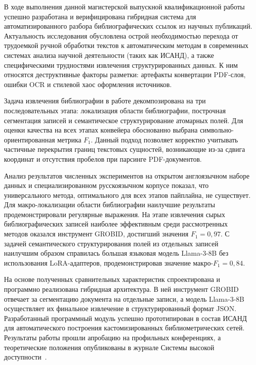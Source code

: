 В ходе выполнения данной магистерской выпускной квалификационной работы успешно разработана и верифицирована гибридная система для авто\-ма\-ти\-зи\-ро\-ван\-но\-го разбора библиографических ссылок из научных публикаций. Актуальность иссле\-до\-ва\-ния обусловлена острой необходимостью перехода от трудоемкой ручной обработки текстов к автоматическим методам в современных сис\-те\-мах анализа научной дея\-тель\-нос\-ти (таких как ИСАНД), а также специфическими трудностями извлечения структурированных данных. К ним относятся деструктивные факторы разметки: ар\-те\-фак\-ты конвертации PDF-слоя, ошибки OCR и \guillemotleft стилевой хаос\guillemotright{} оформления источников.

Задача извлечения библиографии в работе декомпозирована на три последовательных этапа: локализация области библиографии, построчная сегментация записей и се\-ман\-ти\-чес\-кое структурирование атомарных полей. Для оценки качества на всех этапах конвейера обоснованно выбрана символьно-ориентированная метрика $F_1$. Данный подход позволяет корректно учитывать частичные перекрытия границ текстовых сущностей, возникающие из-за сдвига координат и отсутствия пробелов при парсинге PDF-документов.

Анализ результатов численных экспериментов на открытом англоязычном наборе данных и специализированном русскоязычном корпусе показал, что универсального метода, оптимального для всех этапов пайплайна, не существует. Для макро-ло\-ка\-ли\-за\-ции области библиографии наилучшие результаты продемонстрировали регулярные выражения. На этапе извлечения сырых библиографических записей наиболее эф\-фек\-тив\-ным среди рассмотренных методов оказался инструмент GROBID, достигший значения $F_1 = 0{,}97$. С задачей семантического структурирования полей из отдельных записей наилучшим образом справилась большая языковая модель Llama-3-8B без использования LoRA-ад\-ап\-те\-ров, продемонстрировав значение макро-$F_1 = 0{,}84$.

На основе полученных сравнительных характеристик спроектирована и программно реализована гибридная архитектура. В ней инструмент GROBID отвечает за сегментацию документа на отдельные записи, а модель Llama-3-8B осуществляет их финальное извлечение в структурированный формат JSON. Разработанный программный модуль успешно прототипирован в состав ИСАНД для автоматического построения кас\-то\-ми\-зи\-ро\-ван\-ных библиометрических сетей. Результаты работы прошли апробацию на профильных конференциях, а теоретические положения опубликованы в журнале \guillemotleft Системы высокой доступности\guillemotright~\cite{system_higher}.

